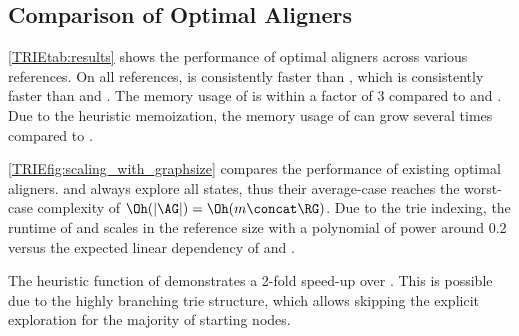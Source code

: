 \subsection{Comparison of Optimal Aligners}

\cref{TRIEtab:results} shows the performance of optimal aligners across various
references. On all references, \astarix is consistently faster than \dijkstra,
which is consistently faster than \pasgal and \bitparallel. The memory usage of
\dijkstra is within a factor of 3 compared to \pasgal and \bitparallel. Due to
the heuristic memoization, the memory usage of \astarix can grow several times
compared to \dijkstra.



\cref{TRIEfig:scaling_with_graphsize} compares the performance of existing optimal
aligners. \bitparallel and \pasgal always explore all states, thus their
average-case reaches the worst-case complexity of $\Oh(\lvert \AG \rvert) =
\Oh(m \concat \RG)$. Due to the trie indexing, the runtime of \astarix and
\dijkstra scales in the reference size with a polynomial of power around $0.2$
versus the expected linear dependency of \bitparallel and \pasgal.

The heuristic function of \astarix demonstrates a 2-fold speed-up over
\dijkstra. This is possible due to the highly branching trie structure, which
allows skipping the explicit exploration for the majority of starting nodes. 


